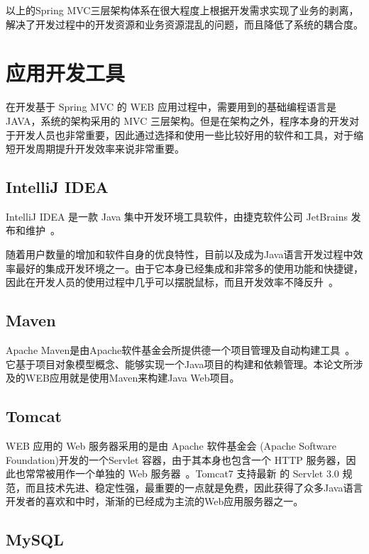 以上的Spring MVC三层架构体系在很大程度上根据开发需求实现了业务的剥离，解决了开发过程中的开发资源和业务资源混乱的问题，而且降低了系统的耦合度。

\section{应用开发工具}

在开发基于 Spring MVC 的 WEB 应用过程中，需要用到的基础编程语言是 JAVA，系统的架构采用的 MVC 三层架构。但是在架构之外，程序本身的开发对于开发人员也非常重要，因此通过选择和使用一些比较好用的软件和工具，对于缩短开发周期提升开发效率来说非常重要。

\subsection{IntelliJ IDEA}

IntelliJ IDEA 是一款 Java 集中开发环境工具软件，由捷克软件公司 JetBrains 发布和维护~\cite{jemerov2008implementing}。

随着用户数量的增加和软件自身的优良特性，目前以及成为Java语言开发过程中效率最好的集成开发环境之一。由于它本身已经集成和非常多的使用功能和快捷键，因此在开发人员的使用过程中几乎可以摆脱鼠标，而且开发效率不降反升~\cite{IDEA维基百科}。

\subsection{Maven}

Apache Maven是由Apache软件基金会所提供德一个项目管理及自动构建工具~\cite{smart2005introduction}。它基于项目对象模型概念、能够实现一个Java项目的构建和依赖管理。本论文所涉及的WEB应用就是使用Maven来构建Java Web项目。

\subsection{Tomcat}

WEB 应用的 Web 服务器采用的是由 Apache 软件基金会 (Apache Software Foundation)开发的一个Servlet 容器，由于其本身也包含一个 HTTP 服务器，因此也常常被用作一个单独的 Web 服务器~\cite{brittain2007tomcat}。Tomcat7 支持最新 的 Servlet 3.0 规范，而且技术先进、稳定性强，最重要的一点就是免费，因此获得了众多Java语言开发者的喜欢和中时，渐渐的已经成为主流的Web应用服务器之一。

\subsection{MySQL}

